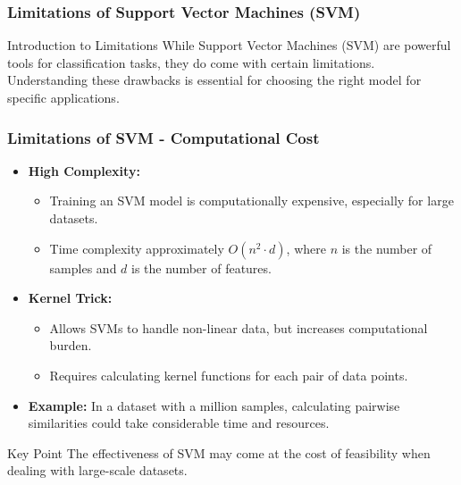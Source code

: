 \documentclass{beamer}
\begin{document}
\begin{frame}[fragile]
    \frametitle{Limitations of Support Vector Machines (SVM)}
    \begin{block}{Introduction to Limitations}
        While Support Vector Machines (SVM) are powerful tools for classification tasks, they do come with certain limitations. Understanding these drawbacks is essential for choosing the right model for specific applications.
    \end{block}
\end{frame}

\begin{frame}[fragile]
    \frametitle{Limitations of SVM - Computational Cost}
    \begin{itemize}
        \item \textbf{High Complexity:} 
        \begin{itemize}
            \item Training an SVM model is computationally expensive, especially for large datasets.
            \item Time complexity approximately \(O(n^2 \cdot d)\), where \(n\) is the number of samples and \(d\) is the number of features.
        \end{itemize}
        \item \textbf{Kernel Trick:} 
        \begin{itemize}
            \item Allows SVMs to handle non-linear data, but increases computational burden. 
            \item Requires calculating kernel functions for each pair of data points.
        \end{itemize}
        \item \textbf{Example:} In a dataset with a million samples, calculating pairwise similarities could take considerable time and resources.
    \end{itemize}
    
    \begin{block}{Key Point}
        The effectiveness of SVM may come at the cost of feasibility when dealing with large-scale datasets.
    \end{block}
\end{frame}
\end{document}

